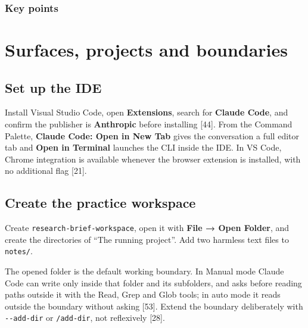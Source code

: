 \documentclass[11pt,a4paper,twoside,openany]{book}
\newcommand{\chaptertitlelabel}{}
\begin{document}
  \subsection*{Key points}
  \begin{itemize}\kprows\end{itemize}
\else
  \noindent\kpbody
\fi
\par\addvspace{1.4mm}
\endgroup


\FloatBarrier
\renewcommand{\chaptertitlelabel}{Part I \textperiodcentered\ Chapter 3}
\setcounter{chapter}{2}
\chapter{Surfaces, projects and boundaries}

\FloatBarrier
\setcounter{section}{0}
\section{Set up the IDE}

Install Visual Studio Code, open \textbf{Extensions}, search for \textbf{Claude Code}, and confirm the publisher is \textbf{Anthropic} before installing [44]. From the Command Palette, \textbf{Claude Code: Open in New Tab} gives the conversation a full editor tab and \textbf{Open in Terminal} launches the CLI inside the IDE. In VS Code, Chrome integration is available whenever the browser extension is installed, with no additional flag [21].


\FloatBarrier
\setcounter{section}{1}
\section{Create the practice workspace}

Create \texttt{research-\allowbreak{}brief-\allowbreak{}workspace}, open it with \textbf{File → Open Folder}, and create the directories of “The running project”. Add two harmless text files to \texttt{notes/\allowbreak{}}.


The opened folder is the default working boundary. In Manual mode Claude Code can write only inside that folder and its subfolders, and asks before reading paths outside it with the Read, Grep and Glob tools; in auto mode it reads outside the boundary without asking [53]. Extend the boundary deliberately with \texttt{-\allowbreak{}-\allowbreak{}add-\allowbreak{}dir} or \texttt{/\allowbreak{}add-\allowbreak{}dir}, not reflexively [28].
\end{document}
